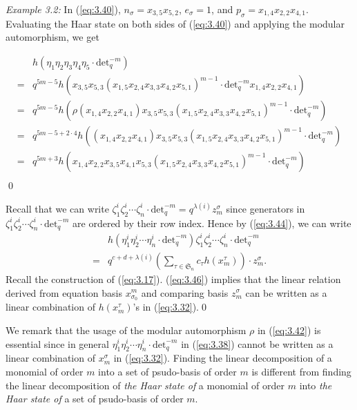 \documentclass[table,a4paper,reqno]{amsart}
\numberwithin{equation}{section}
\theoremstyle{definition}
\begin{document}
\textit{Example 3.2:} In (\ref{eq:3.40}), $n_\sigma=x_{3,5}x_{5,2}$, $e_\sigma=1$, and $p_\sigma=x_{1,4}x_{2,2}x_{4,1}$. Evaluating the Haar state on both sides of (\ref{eq:3.40}) and applying the modular automorphism, we get
\begin{samepage}
\begin{equation}\label{eq:3.45}
    \begin{split}
        &h\left(\eta_1\eta_2\eta_3\eta_4\eta_5\cdot\text{det}_q^{-m}\right)\\
        =&q^{5m-5}h\left(x_{3,5}x_{5,3}(x_{1,5}x_{2,4}x_{3,3}x_{4,2}x_{5,1})^{m-1}\cdot\text{det}_q^{-m}x_{1,4}x_{2,2}x_{4,1}\right)\\
        =&q^{5m-5}h\left(\rho(x_{1,4}x_{2,2}x_{4,1})x_{3,5}x_{5,3}(x_{1,5}x_{2,4}x_{3,3}x_{4,2}x_{5,1})^{m-1}\cdot\text{det}_q^{-m}\right)\\
        =&q^{5m-5+2\cdot 4}h\left((x_{1,4}x_{2,2}x_{4,1})x_{3,5}x_{5,3}(x_{1,5}x_{2,4}x_{3,3}x_{4,2}x_{5,1})^{m-1}\cdot\text{det}_q^{-m}\right)\\
        =&q^{5m+3}h\left(x_{1,4}x_{2,2}x_{3,5}x_{4,1}x_{5,3}(x_{1,5}x_{2,4}x_{3,3}x_{4,2}x_{5,1})^{m-1}\cdot\text{det}_q^{-m}\right)\\
    \end{split}
\end{equation}\qed
\end{samepage}


Recall that we can write $\zeta^i_1\zeta^i_2\cdots \zeta^i_n\cdot\text{det}_q^{-m}=q^{\lambda(i)}z_m^\sigma$ since generators in $\zeta^i_1\zeta^i_2\cdots \zeta^i_n\cdot\text{det}_q^{-m}$ are ordered by their row index. Hence by (\ref{eq:3.44}), we can write
\begin{equation}\label{eq:3.46}
    \begin{split}
        &h\left(\eta^i_1\eta^i_2\cdots \eta^i_n\cdot\text{det}_q^{-m}\right)\zeta^i_1\zeta^i_2\cdots \zeta^i_n\cdot\text{det}_q^{-m}\\
        =&q^{c+d+\lambda(i)} \left(\sum_{\tau\in\mathfrak{S}_n}c_{\tau}h(x^\tau_m)\right)\cdot z_m^\sigma.
    \end{split}
\end{equation}
Recall the construction of (\ref{eq:3.17}). (\ref{eq:3.46}) implies that the linear relation derived from equation basis $x_{\sigma_0}^m$ and comparing basis $z_m^\sigma$ can be written as a linear combination of $h(x_m^\tau)$'s in (\ref{eq:3.32}).\qed

We remark that the usage of the modular automorphism $\rho$ in (\ref{eq:3.42}) is essential since in general $\eta^i_1\eta^i_2\cdots \eta^i_n\cdot\text{det}_q^{-m}$ in (\ref{eq:3.38}) cannot be written as a linear combination of $x_m^\sigma$ in (\ref{eq:3.32}). Finding the linear decomposition of a monomial of order $m$ into a set of psudo-basis of order $m$ is different from finding the linear decomposition of \textit{the Haar state of} a monomial of order $m$ into \textit{the Haar state of} a set of psudo-basis of order $m$.
\end{document}
